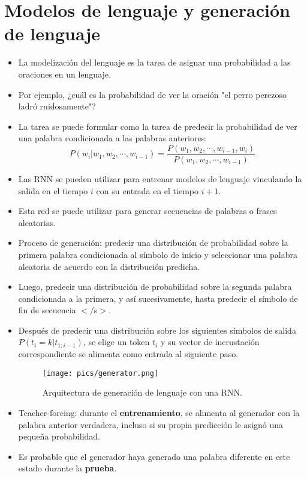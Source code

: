
\section{Modelos de lenguaje y generación de lenguaje}
\begin{itemize}
\item La modelización del lenguaje es la tarea de asignar una probabilidad a las oraciones en un lenguaje.
\item Por ejemplo, ¿cuál es la probabilidad de ver la oración "el perro perezoso ladró ruidosamente"?
\item La tarea se puede formular como la tarea de predecir la probabilidad de ver una palabra condicionada a las palabras anteriores:
\begin{displaymath}
P(w_i | w_1, w_2, \cdots, w_{i-1}) = \frac{P(w_1, w_2, \cdots, w_{i-1}, w_i)}{P(w_1, w_2, \cdots, w_{i-1})}
\end{displaymath}
\item Las RNN se pueden utilizar para entrenar modelos de lenguaje vinculando la salida en el tiempo $i$ con su entrada en el tiempo $i + 1$.
\item Esta red se puede utilizar para generar secuencias de palabras o frases aleatorias.
\item Proceso de generación: predecir una distribución de probabilidad sobre la primera palabra condicionada al símbolo de inicio y seleccionar una palabra aleatoria de acuerdo con la distribución predicha.
\item Luego, predecir una distribución de probabilidad sobre la segunda palabra condicionada a la primera, y así sucesivamente, hasta predecir el símbolo de fin de secuencia $</$s$>$.
\item Después de predecir una distribución sobre los siguientes símbolos de salida $P(t_i = k | t_{1:i-1})$, se elige un token $t_i$ y su vector de incrustación correspondiente se alimenta como entrada al siguiente paso.
         \begin{figure}[h]
        	\centering
        	\texttt{[image: pics/generator.png]}
        	\caption{Arquitectura de generación de lenguaje con una RNN.}
        \end{figure}
\item Teacher-forcing: durante el \textbf{entrenamiento}, se alimenta al generador con la palabra anterior verdadera, incluso si su propia predicción le asignó una pequeña probabilidad.
\item Es probable que el generador haya generado una palabra diferente en este estado durante la \textbf{prueba}.
\end{itemize}





